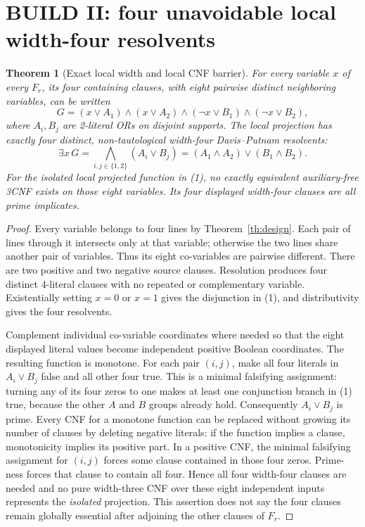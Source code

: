 \documentclass[10pt]{article}
\newtheorem{theorem}{Theorem}
\begin{document}
\section{BUILD II: four unavoidable local width-four resolvents}
\begin{theorem}[Exact local width and local CNF barrier]\label{th:pivot}
For \emph{every} variable $x$ of \emph{every} $F_r$, its four containing clauses, with eight pairwise distinct neighboring variables, can be written
\[
 G=(x\vee A_1)\land(x\vee A_2)\land(\neg x\vee B_1)\land(\neg x\vee B_2),
\]
where $A_i,B_j$ are 2-literal ORs on disjoint supports. The local projection has exactly four distinct, non-tautological width-four Davis--Putnam resolvents:
\[
 \exists x\,G=\bigwedge_{i,j\in\{1,2\}}(A_i\vee B_j)
 = (A_1\wedge A_2)\vee(B_1\wedge B_2). \tag{1}
\]
For the isolated local projected function in (1), no exactly equivalent \emph{auxiliary-free} 3CNF exists on those eight variables. Its four displayed width-four clauses are all prime implicates.
\end{theorem}
\begin{proof}
Every variable belongs to four lines by Theorem~\ref{th:design}. Each pair of lines through it intersects only at that variable; otherwise the two lines share another pair of variables. Thus its eight co-variables are pairwise different. There are two positive and two negative source clauses. Resolution produces four distinct 4-literal clauses with no repeated or complementary variable. Existentially setting $x=0$ or $x=1$ gives the disjunction in (1), and distributivity gives the four resolvents.

Complement individual co-variable coordinates where needed so that the eight displayed literal values become independent positive Boolean coordinates. The resulting function is monotone. For each pair $(i,j)$, make all four literals in $A_i\vee B_j$ false and all other four true. This is a minimal falsifying assignment: turning any of its four zeros to one makes at least one conjunction branch in (1) true, because the other $A$ and $B$ groups already hold. Consequently $A_i\vee B_j$ is prime. Every CNF for a monotone function can be replaced without growing its number of clauses by deleting negative literals: if the function implies a clause, monotonicity implies its positive part. In a positive CNF, the minimal falsifying assignment for $(i,j)$ forces some clause contained in those four zeros. Prime-ness forces that clause to contain all four. Hence all four width-four clauses are needed and no pure width-three CNF over these eight independent inputs represents the \emph{isolated} projection. This assertion does not say the four clauses remain globally essential after adjoining the other clauses of $F_r$.
\end{proof}
\end{document}
